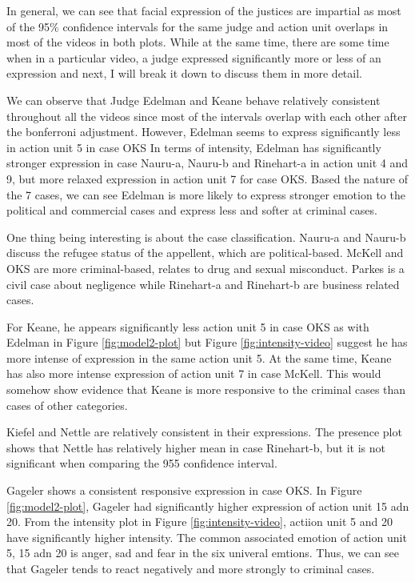 \documentclass{monashthesis}
\begin{document}
In general, we can see that facial expression of the justices are impartial as most of the 95\% confidence intervals for the same judge and action unit overlaps in most of the videos in both plots. While at the same time, there are some time when in a particular video, a judge expressed significantly more or less of an expression and next, I will break it down to discuss them in more detail.

We can observe that Judge Edelman and Keane behave relatively consistent throughout all the videos since most of the intervals overlap with each other after the bonferroni adjustment. However, Edelman seems to express significantly less in action unit 5 in case OKS In terms of intensity, Edelman has significantly stronger expression in case Nauru-a, Nauru-b and Rinehart-a in action unit 4 and 9, but more relaxed expression in action unit 7 for case OKS. Based the nature of the 7 cases, we can see Edelman is more likely to express stronger emotion to the political and commercial cases and express less and softer at criminal cases.

One thing being interesting is about the case classification. Nauru-a and Nauru-b discuss the refugee status of the appellent, which are political-based. McKell and OKS are more criminal-based, relates to drug and sexual misconduct. Parkes is a civil case about negligence while Rinehart-a and Rinehart-b are business related cases.

For Keane, he appears significantly less action unit 5 in case OKS as with Edelman in Figure \ref{fig:model2-plot} but Figure \ref{fig:intensity-video} suggest he has more intense of expression in the same action unit 5. At the same time, Keane has also more intense expression of action unit 7 in case McKell. This would somehow show evidence that Keane is more responsive to the criminal cases than cases of other categories.

Kiefel and Nettle are relatively consistent in their expressions. The presence plot shows that Nettle has relatively higher mean in case Rinehart-b, but it is not significant when comparing the 955 confidence interval.

Gageler shows a consistent responsive expression in case OKS. In Figure \ref{fig:model2-plot}, Gageler had significantly higher expression of action unit 15 adn 20. From the intensity plot in Figure \ref{fig:intensity-video}, actiion unit 5 and 20 have significantly higher intensity. The common associated emotion of action unit 5, 15 adn 20 is anger, sad and fear in the six univeral emtions. Thus, we can see that Gageler tends to react negatively and more strongly to criminal cases.
\end{document}
